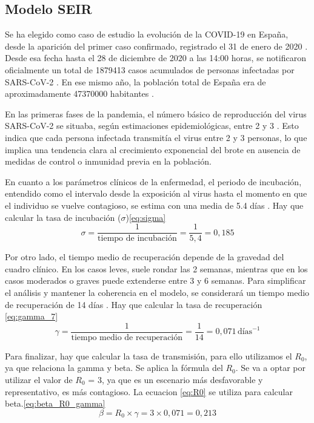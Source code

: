\subsection{Modelo SEIR}
Se ha elegido como caso de estudio la evolución de la COVID-19 en España, desde la aparición del primer caso confirmado, registrado el 31 de enero de 2020 \cite{primer_caso_covid_espana}. Desde esa fecha hasta el 28 de diciembre de 2020 a las 14:00 horas, se notificaron oficialmente un total de 1879413 casos acumulados de personas infectadas por SARS-CoV-2 \cite{sanidad_covid_situacion}. En ese mismo año, la población total de España era de aproximadamente 47370000 habitantes \cite{datacommons_espana_demografia}.

En las primeras fases de la pandemia, el número básico de reproducción del virus SARS-CoV-2 se situaba, según estimaciones epidemiológicas, entre 2 y 3 \cite{garcia_r0_desescalada}. Esto indica que cada persona infectada transmitía el virus entre 2 y 3 personas, lo que implica una tendencia clara al crecimiento exponencial del brote en ausencia de medidas de control o inmunidad previa en la población.

En cuanto a los parámetros clínicos de la enfermedad, el periodo de incubación, entendido como el intervalo desde la exposición al virus hasta el momento en que el individuo se vuelve contagioso, se estima con una media de 5.4 días \cite{lauer2020incubation}. Hay que calcular la tasa de incubación ($\sigma$)\eqref{eq:sigma}
\begin{equation}
\sigma = \frac{1}{\text{tiempo de incubación}} = \frac{1}{5{,}4} = 0{,}185
\label{eq:sigma}
\end{equation}

Por otro lado, el tiempo medio de recuperación depende de la gravedad del cuadro clínico. En los casos leves, suele rondar las 2 semanas, mientras que en los casos moderados o graves puede extenderse entre 3 y 6 semanas. Para simplificar el análisis y mantener la coherencia en el modelo, se considerará un tiempo medio de recuperación de 14 días \cite{ada_duracion_covid}. Hay que calcular la tasa de recuperación \eqref{eq:gamma_7}
\begin{equation}
\gamma = \frac{1}{\text{tiempo medio de recuperación}} = \frac{1}{14} = 0{,}071 \,\text{días}^{-1}
\label{eq:gamma_7}
\end{equation}

Para finalizar, hay que calcular la tasa de transmisión, para ello utilizamos el $R_0$, ya que relaciona la gamma y beta. Se aplica la fórmula del $R_0$. Se va a optar por utilizar el valor de $R_0$ = 3, ya que es un escenario más desfavorable y representativo, es más contagioso. La ecuacion \eqref{eq:R0} se utiliza para calcular beta.\eqref{eq:beta_R0_gamma}
\begin{equation}
\beta = R_0 \times \gamma = 3 \times 0{,}071 = 0{,}213
\label{eq:beta_R0_gamma}
\end{equation}

